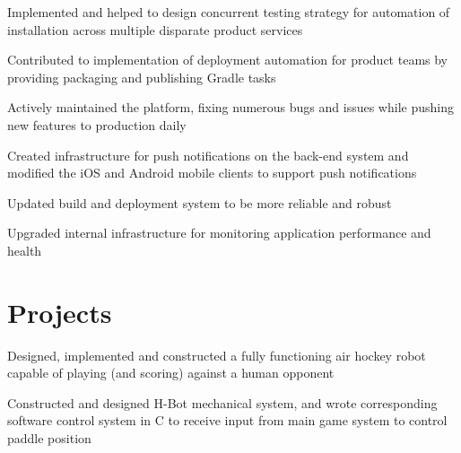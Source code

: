 \documentclass[]{deedy-resume}
\begin{document}
\begin{minipage}[t]{0.66\textwidth}

\begin{tightemize}
\item Implemented and helped to design concurrent testing strategy for automation of installation across multiple disparate product services
\item Contributed to implementation of deployment automation for product teams by providing packaging and publishing Gradle tasks
\end{tightemize}
\sectionsep



\begin{tightemize}
\item Actively maintained the platform, fixing numerous bugs and issues while pushing new features to production daily
\item Created infrastructure for push notifications on the back-end system and modified the iOS and Android mobile clients to support push notifications
\item Updated build and deployment system to be more reliable and robust
\item Upgraded internal infrastructure for monitoring application performance and health
\end{tightemize}
\sectionsep



\section{Projects}

\begin{tightemize}
\item Designed, implemented and constructed a fully functioning air hockey robot capable of playing (and scoring) against a human opponent
\item Constructed and designed H-Bot mechanical system, and wrote corresponding software control system in C to receive input from main game system to control paddle position
\end{tightemize}


\end{minipage}
\end{document}

